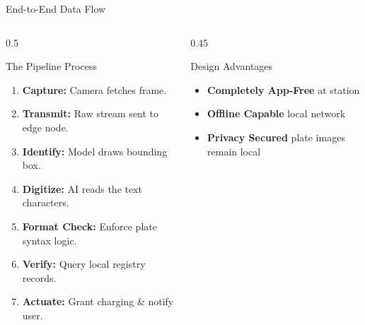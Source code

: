 \documentclass[aspectratio=169,11pt]{beamer}
\begin{document}
\begin{frame}{End-to-End Data Flow}
\begin{columns}
\begin{column}{0.5\textwidth}
\begin{block}{The Pipeline Process}
\begin{enumerate}
    \item \textbf{Capture:} Camera fetches frame.
    \item \textbf{Transmit:} Raw stream sent to edge node.
    \item \textbf{Identify:} Model draws bounding box.
    \item \textbf{Digitize:} AI reads the text characters.
    \item \textbf{Format Check:} Enforce plate syntax logic.
    \item \textbf{Verify:} Query local registry records.
    \item \textbf{Actuate:} Grant charging \& notify user.
\end{enumerate}
\end{block}
\end{column}
\begin{column}{0.45\textwidth}
\begin{exampleblock}{Design Advantages}
\begin{itemize}
    \item \textbf{Completely App-Free} at station
    \item \textbf{Offline Capable} local network
    \item \textbf{Privacy Secured} plate images remain local
\end{itemize}
\end{exampleblock}
\end{column}
\end{columns}
\end{frame}
\end{document}
